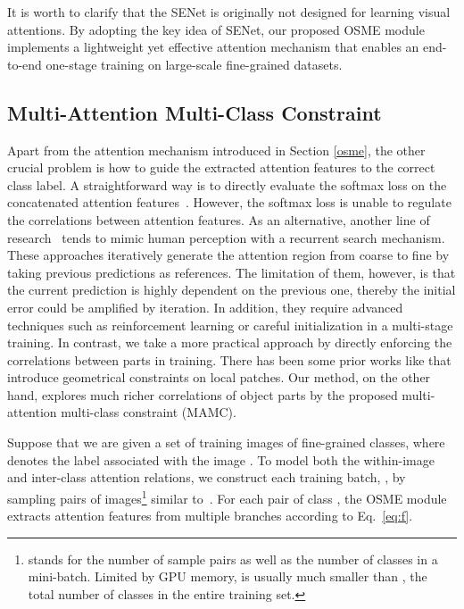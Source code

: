 \documentclass[runningheads]{llncs}
\begin{document}
It is worth to clarify that the SENet is originally not designed for learning visual attentions.
By adopting the key idea of SENet, our proposed OSME module implements a lightweight yet effective attention mechanism that enables an end-to-end one-stage training on large-scale fine-grained datasets.





\vspace{-.1in}
\subsection{Multi-Attention Multi-Class Constraint}
\label{mamc}

Apart from the attention mechanism introduced in Section \ref{osme}, the other crucial problem is how to guide the extracted attention features to the correct class label.
A straightforward way is to directly evaluate the softmax loss on the concatenated attention features~\cite{jaderberg2015spatial}.
However, the softmax loss is unable to regulate the correlations between attention features.
As an alternative, another line of research~\cite{MnihHGK14,liu2016fully,fu2017look} tends to mimic human perception with a recurrent search mechanism.
These approaches iteratively generate the attention region from coarse to fine by taking previous predictions as references.
The limitation of them, however, is that the current prediction is highly dependent on the previous one, thereby the initial error could be amplified by iteration.
In addition, they require advanced techniques such as reinforcement learning or careful initialization in a multi-stage training.
In contrast, we take a more practical approach by directly enforcing the correlations between parts in training.
There has been some prior works like \cite{wang2016mining} that introduce geometrical constraints on local patches.
Our method, on the other hand, explores much richer correlations of object parts by the proposed multi-attention multi-class constraint (MAMC).



Suppose that we are given a set of training images  of  fine-grained classes, where  denotes the label associated with the image .
To model both the within-image and inter-class attention relations, we construct each training batch, , by sampling  pairs of images\footnote{ stands for the number of sample pairs as well as the number of classes in a mini-batch. Limited by GPU memory,  is usually much smaller than , the total number of classes in the entire training set.} similar to~\cite{sohn2016improved}.
For each pair  of class ,
the OSME module extracts  attention features  from multiple branches according to Eq.~\ref{eq:f}.
\end{document}
